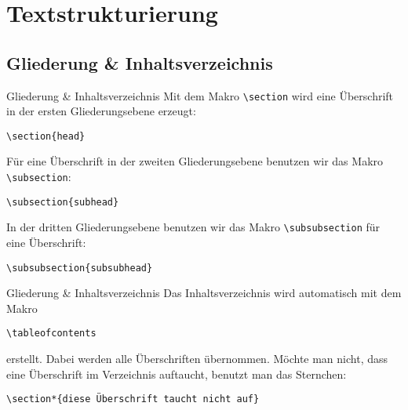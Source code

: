 \section{Textstrukturierung}

\subsection{Gliederung \& Inhaltsverzeichnis}
\begin{frame}[fragile]{Gliederung \& Inhaltsverzeichnis}
Mit dem Makro \texttt{\textbackslash section} wird eine Überschrift in der ersten Gliederungsebene erzeugt:
\begin{lstlisting}[style=tex]
\section{head}
\end{lstlisting}
Für eine Überschrift in der zweiten Gliederungsebene benutzen wir das Makro \texttt{\textbackslash subsection}:
\begin{lstlisting}[style=tex]
\subsection{subhead}
\end{lstlisting}
In der dritten Gliederungsebene benutzen wir das Makro \texttt{\textbackslash subsubsection} für eine Überschrift:
\begin{lstlisting}[style=tex]
\subsubsection{subsubhead}
\end{lstlisting}
\end{frame}

\begin{frame}[fragile]{Gliederung \& Inhaltsverzeichnis}
Das Inhaltsverzeichnis wird automatisch mit dem Makro
\begin{lstlisting}[style=tex]
\tableofcontents
\end{lstlisting}
erstellt. Dabei werden alle Überschriften übernommen.
\newline
\newline
Möchte man nicht, dass eine Überschrift im Verzeichnis auftaucht, benutzt man das Sternchen:
\begin{lstlisting}[style=tex]
\section*{diese Überschrift taucht nicht auf}
\end{lstlisting}
\end{frame}

